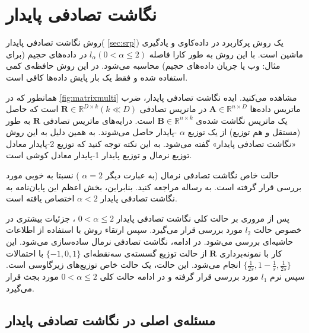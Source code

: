 \chapter{
نگاشت تصادفی پایدار
}

روش نگاشت تصادفی پایدار(%
\autoref{sec:srp})
\cite{litez116, litez166, litez19, litez99, litez96, litez104}
یک روش پرکاربرد در داده‌کاوی و یادگیری ماشین است. با این روش به طور کارا فاصله
$l_\alpha (0 < \alpha \leq 2)$
در داده‌های حجیم (برای مثال: وب یا جریان‌ داده‌‌های حجیم) محاسبه می‌شود. در این روش حافظه‌ی کمی استفاده شده و فقط یک بار پایش داده‌ها کافی است. 

همانطور که در 
\autoref{fig:matrixmulti}
مشاهده می‌کنید. ایده نگاشت تصادفی پایدار، ضرب ماتریس داده‌ها
$\mathbf{A} \in \mathbb{R}^{n \times D}$
در ماتریس تصادفی 
$\mathbf{R} \in \mathbb{R}^{D \times k}  (k \ll D)$
است که حاصل یک ماتریس نگاشت شده‌ی 
$\mathbf{B} \in \mathbb{R}^{n \times k}$
است. درایه‌های ماتریس تصادفی 
$\mathbf{R}$
به طور 
(مستقل و هم توزیع)
از یک توزیع 
$\alpha$
-پایدار %
حاصل می‌شوند. به همین دلیل به این روش «نگاشت تصادفی پایدار» گفته می‌شود. به این نکته توجه کنید که توزیع 2-پایدار معادل توزیع نرمال و توزیع پایدار 1-پایدار معادل کوشی%
است.

حالت خاص نگاشت تصادفی نرمال (به عبارت دیگر
$\alpha = 2$
) نسبتا به خوبی مورد بررسی قرار گرفته است. به رساله
\cite{litez166}
مراجعه کنید. بنابراین، بخش اعظم این پایان‌نامه به نگاشت تصادفی پایدار 
$\alpha < 2$
اختصاص یافته است.


پس از مروری بر حالت کلی نگاشت تصادفی پایدار 
$0 < \alpha \leq 2$
، جزئیات بیشتری در خصوص حالت 
$l_2$
مورد بررسی قرار می‌گیرد. سپس ارتقاء روش با استفاده از اطلاعات حاشیه‌ای%
بررسی می‌شود. در ادامه، نگاشت تصادفی نرمال ساده‌سازی می‌شود. این کار با نمونه‌برداری 
$\mathbf{R}$
از حالت توزیع گسسته‌ی سه‌نقطه‌ای 
$\{ -1, 0, 1 \}$
با احتمالات
$\{ \frac{1}{2s} , 1- \frac{1}{s}, \frac{1}{2s} \}$
انجام می‌شود. این حالت، یک حالت خاص توزیع‌های زیرگاوسی%
است. سپس نرم 
$l_1$%
مورد بررسی قرار گرفته و در ادامه حالت کلی 
$0 < \alpha \leq 2$
مورد بجث قرار می‌گیرد.

\section{
مسئله‌ی اصلی در نگاشت تصادفی پایدار
}

